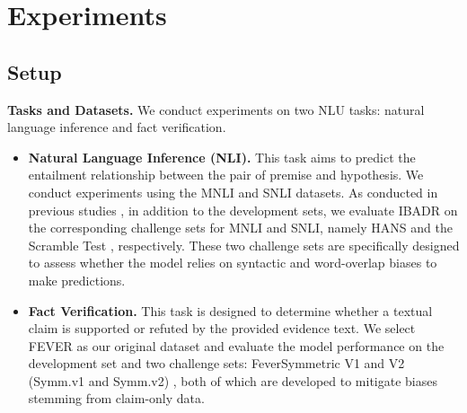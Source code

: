 \documentclass[11pt]{article}
\def\model{\textsc{IBADR}\xspace}
\begin{document}
\section{Experiments}
\subsection{Setup}

\indent \indent \textbf{Tasks and Datasets.}
We conduct experiments on two NLU tasks: natural language inference and fact verification.

\begin{itemize}
    \item \textbf{Natural Language Inference (NLI).} This task aims to predict the entailment relationship between the pair of premise and hypothesis. We conduct experiments using the MNLI \cite{WilliamsNB18_mnli} and SNLI \cite{Bowman2015} datasets. As conducted in previous studies \cite{stacey-etal-2020-avoiding, wu2022generating,lyu2022feature}, in addition to the development sets, we evaluate \model on the corresponding challenge sets for MNLI and SNLI, namely HANS \cite{McCoyPL19} and the Scramble Test \cite{DasguptaGSGG18}, respectively. These two challenge sets are specifically designed to assess whether the model relies on syntactic and word-overlap biases to make predictions.
    \item \textbf{Fact Verification.} This task is designed to determine whether a textual claim is supported or refuted by the provided evidence text. We select FEVER \cite{ThorneVCM18_fever} as our original dataset and evaluate the model performance on the development set and two challenge sets: FeverSymmetric V1 and V2 (Symm.v1 and Symm.v2) \cite{feversymm2019}, both of which are developed to mitigate biases stemming from claim-only data. 
\end{itemize}
\end{document}
